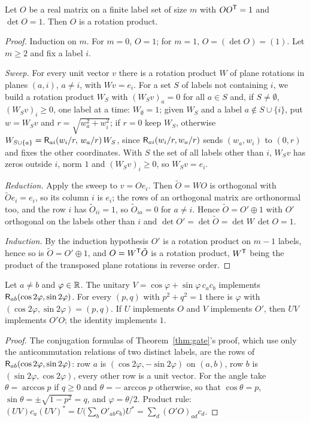 \begin{theorem}\label{thm:givens}
Let $O$ be a real matrix on a finite label set of size $m$ with $OO^{\mathsf T}=1$ and
$\det O=1$. Then $O$ is a rotation product.
\end{theorem}
\begin{proof}
Induction on $m$. For $m=0$, $O=1$; for $m=1$, $O=(\det O)=(1)$. Let $m\geq2$ and fix a
label $i$.

\emph{Sweep.} For every unit vector $v$ there is a rotation product $W$ of plane rotations
in planes $(a,i)$, $a\neq i$, with $Wv=e_i$. For a set $S$ of labels not containing $i$,
we build a rotation product $W_S$ with $(W_Sv)_a=0$ for all $a\in S$ and, if $S\neq\emptyset$,
$(W_Sv)_i\geq0$, one label at a time: $W_\emptyset=1$; given $W_S$ and a label
$a\notin S\cup\{i\}$, put $w=W_Sv$ and $r=\sqrt{w_a^2+w_i^2}$; if $r=0$ keep $W_S$,
otherwise $W_{S\cup\{a\}}=\mathsf R_{ai}(w_i/r,\,w_a/r)\,W_S$, since $\mathsf R_{ai}(w_i/r,w_a/r)$ sends
$(w_a,w_i)$ to $(0,r)$ and fixes the other coordinates. With $S$ the set of all labels
other than $i$, $W_Sv$ has zeros outside $i$, norm $1$ and $(W_Sv)_i\geq0$, so $W_Sv=e_i$.

\emph{Reduction.} Apply the sweep to $v=Oe_i$. Then $\tilde O=WO$ is orthogonal with $\tilde Oe_i=e_i$,
so its column $i$ is $e_i$; the rows of an orthogonal matrix are orthonormal too, and the
row $i$ has $\tilde O_{ii}=1$, so $\tilde O_{ia}=0$ for $a\neq i$. Hence $\tilde O=O'\oplus1$ with $O'$
orthogonal on the labels other than $i$ and $\det O'=\det \tilde O=\det W\,\det O=1$.

\emph{Induction.} By the induction hypothesis $O'$ is a rotation product on $m-1$ labels,
hence so is $\tilde O=O'\oplus1$, and $O=W^{\mathsf T}\tilde O$ is a rotation product, $W^{\mathsf T}$ being the
product of the transposed plane rotations in reverse order.
\end{proof}

\begin{lemma}\label{lem:factor}
Let $a\neq b$ and $\varphi\in\mathbb R$. The unitary $V=\cos\varphi+\sin\varphi\,c_ac_b$ implements
$\mathsf R_{ab}(\cos2\varphi,\sin2\varphi)$. For every $(p,q)$ with $p^2+q^2=1$ there is $\varphi$
with $(\cos2\varphi,\sin2\varphi)=(p,q)$. If $U$ implements $O$ and $V$ implements $O'$,
then $UV$ implements $O'O$; the identity implements $1$.
\end{lemma}
\begin{proof}
The conjugation formulas of Theorem~\ref{thm:gate}'s proof, which use only the
anticommutation relations of two distinct labels, are the rows of
$\mathsf R_{ab}(\cos2\varphi,\sin2\varphi)$: row $a$ is $(\cos2\varphi,-\sin2\varphi)$ on $(a,b)$,
row $b$ is $(\sin2\varphi,\cos2\varphi)$, every other row is a unit vector. For the angle take
$\theta=\arccos p$ if $q\geq0$ and $\theta=-\arccos p$ otherwise, so that $\cos\theta=p$,
$\sin\theta=\pm\sqrt{1-p^2}=q$, and $\varphi=\theta/2$. Product rule:
$(UV)c_a(UV)^*=U\bigl(\sum_bO'_{ab}c_b\bigr)U^*=\sum_d(O'O)_{ad}c_d$.
\end{proof}

